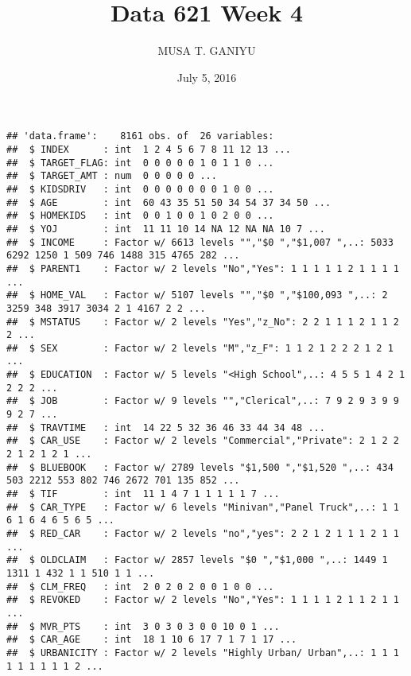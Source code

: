 \documentclass[]{article}
\title{Data 621 Week 4}
\author{MUSA T. GANIYU}
\date{July 5, 2016}
\begin{document}
\maketitle

\begin{verbatim}
## 'data.frame':    8161 obs. of  26 variables:
##  $ INDEX      : int  1 2 4 5 6 7 8 11 12 13 ...
##  $ TARGET_FLAG: int  0 0 0 0 0 1 0 1 1 0 ...
##  $ TARGET_AMT : num  0 0 0 0 0 ...
##  $ KIDSDRIV   : int  0 0 0 0 0 0 0 1 0 0 ...
##  $ AGE        : int  60 43 35 51 50 34 54 37 34 50 ...
##  $ HOMEKIDS   : int  0 0 1 0 0 1 0 2 0 0 ...
##  $ YOJ        : int  11 11 10 14 NA 12 NA NA 10 7 ...
##  $ INCOME     : Factor w/ 6613 levels "","$0 ","$1,007 ",..: 5033 6292 1250 1 509 746 1488 315 4765 282 ...
##  $ PARENT1    : Factor w/ 2 levels "No","Yes": 1 1 1 1 1 2 1 1 1 1 ...
##  $ HOME_VAL   : Factor w/ 5107 levels "","$0 ","$100,093 ",..: 2 3259 348 3917 3034 2 1 4167 2 2 ...
##  $ MSTATUS    : Factor w/ 2 levels "Yes","z_No": 2 2 1 1 1 2 1 1 2 2 ...
##  $ SEX        : Factor w/ 2 levels "M","z_F": 1 1 2 1 2 2 2 1 2 1 ...
##  $ EDUCATION  : Factor w/ 5 levels "<High School",..: 4 5 5 1 4 2 1 2 2 2 ...
##  $ JOB        : Factor w/ 9 levels "","Clerical",..: 7 9 2 9 3 9 9 9 2 7 ...
##  $ TRAVTIME   : int  14 22 5 32 36 46 33 44 34 48 ...
##  $ CAR_USE    : Factor w/ 2 levels "Commercial","Private": 2 1 2 2 2 1 2 1 2 1 ...
##  $ BLUEBOOK   : Factor w/ 2789 levels "$1,500 ","$1,520 ",..: 434 503 2212 553 802 746 2672 701 135 852 ...
##  $ TIF        : int  11 1 4 7 1 1 1 1 1 7 ...
##  $ CAR_TYPE   : Factor w/ 6 levels "Minivan","Panel Truck",..: 1 1 6 1 6 4 6 5 6 5 ...
##  $ RED_CAR    : Factor w/ 2 levels "no","yes": 2 2 1 2 1 1 1 2 1 1 ...
##  $ OLDCLAIM   : Factor w/ 2857 levels "$0 ","$1,000 ",..: 1449 1 1311 1 432 1 1 510 1 1 ...
##  $ CLM_FREQ   : int  2 0 2 0 2 0 0 1 0 0 ...
##  $ REVOKED    : Factor w/ 2 levels "No","Yes": 1 1 1 1 2 1 1 2 1 1 ...
##  $ MVR_PTS    : int  3 0 3 0 3 0 0 10 0 1 ...
##  $ CAR_AGE    : int  18 1 10 6 17 7 1 7 1 17 ...
##  $ URBANICITY : Factor w/ 2 levels "Highly Urban/ Urban",..: 1 1 1 1 1 1 1 1 1 2 ...
\end{verbatim}
\end{document}
